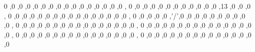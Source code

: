 \begin{DoxyCode}
        
                                        {

        0  ,0  ,0  ,0  ,0  ,0  ,0  ,0  ,0  ,0  ,0  ,0  ,0  ,0  ,0  ,0  ,        
        0  ,0  ,0  ,0  ,0  ,0  ,0  ,0  ,0  ,0  ,0  ,0  ,13 ,0  ,0  ,0  ,        
        0  ,0  ,0  ,0  ,0  ,0  ,0  ,0  ,0  ,0  ,0  ,0  ,0  ,0  ,0  ,0  ,        
        0  ,0  ,0  ,0  ,0  ,'/',0  ,0  ,0  ,0  ,0  ,0  ,0  ,0  ,0  ,0  ,        
        0  ,0  ,0  ,0  ,0  ,0  ,0  ,0  ,0  ,0  ,0  ,0  ,0  ,0  ,0  ,0  ,        
        0  ,0  ,0  ,0  ,0  ,0  ,0  ,0  ,0  ,0  ,0  ,0  ,0  ,0  ,0  ,0  ,        
        0  ,0  ,0  ,0  ,0  ,0  ,0  ,0  ,0  ,0  ,0  ,0  ,0  ,0  ,0  ,0  ,        
        0  ,0  ,0  ,0  ,0  ,0  ,0  ,0  ,0  ,0  ,0  ,0  ,0  ,0  ,0  ,0           
                                        }
\end{DoxyCode}
